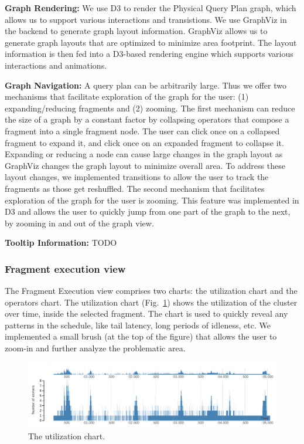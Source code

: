 \documentclass{chi2009}
\newcommand*{\graph}{Physical Query Plan\xspace}
\newcommand*{\fragment}{Fragment Execution\xspace}
\begin{document}
\textbf{Graph Rendering:} We use D3 to render the \graph graph, which allows us to support various interactions and transistions. We use GraphViz \cite{Ellson01graphviz} in the backend to generate graph layout information. GraphViz allows us to generate graph layouts that are optimized to minimize area footprint. The layout information is then fed into a D3-based rendering engine which supports various interactions and animations.

\textbf{Graph Navigation:} A query plan can be arbitrarily large. Thus we offer two mechanisms that facilitate exploration of the graph for the user: (1) expanding/reducing fragments and (2) zooming. The first mechanism can reduce the size of a graph by a constant factor by collapsing operators that compose a fragment into a single fragment node. The user can click once on a collapsed fragment to expand it, and click once on an expanded fragment to collapse it. Expanding or reducing a node can cause large changes in the graph layout as GraphViz changes the graph layout to minimize overall area. To address these layout changes, we implemented transitions to allow the user to track the fragments as those get reshuffled. The second mechanism that facilitates exploration of the graph for the user is zooming. This feature was implemented in D3 and allows the user to quickly jump from one part of the graph to the next, by zooming in and out of the graph view.

\textbf{Tooltip Information:} TODO


\subsubsection{Fragment execution view}


The \fragment view comprises two charts: the utilization chart and the
operators chart. The utilization chart (Fig.~\ref{fig:utilization_chart}) shows the utilization
of the cluster over time, inside the selected fragment. The chart is used to
quickly reveal any patterns in the schedule, like tail latency, long periods of
idleness, etc. We implemented a small brush (at the top of the figure) that
allows the user to zoom-in and further analyze the problematic area.

\begin{figure}[ht]
  \includegraphics[width=\columnwidth]{images/utilization_chart}
  \caption{The utilization chart. }
  \label{fig:utilization_chart}
\end{figure}
\end{document}
